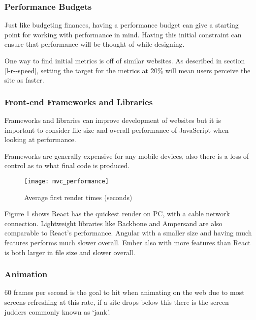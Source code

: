 \subsubsection{Performance Budgets} \label{l-r--performance-budgets}

Just like budgeting finances, having a performance budget can give a starting point for working with performance in mind. Having this initial constraint can ensure that performance will be thought of while designing. \cite{performance_budget}

One way to find initial metrics is off of similar websites. As described in section \ref{l-r--speed}, setting the target for the metrics at 20\% will mean users perceive the site as faster.

\subsubsection{Front-end Frameworks and Libraries} \label{l-r--frameworks}

Frameworks and libraries can improve development of websites but it is important to consider file size and overall performance of JavaScript when looking at performance.

Frameworks are generally expensive for any mobile devices, also there is a loss of control as to what final code is produced. \cite{cost_of_frameworks}

\begin{figure}[H]
  \centering
    \texttt{[image: mvc\_performance]}
  \caption{Average first render times (seconds) \protect\cite{performance_mvc}}
  \label{figure-average-first-render}
\end{figure}

Figure \ref{figure-average-first-render} shows React has the quickest render on PC, with a cable network connection. Lightweight libraries like Backbone and Ampersand are also comparable to React's performance. Angular with a smaller size and  having much features performs much slower overall. Ember also with more features than React is both larger in file size and slower overall.

\subsubsection{Animation} \label{l-r--animation}

60 frames per second is the goal to hit when animating on the web due to most screens refreshing at this rate, if a site drops below this there is the screen judders commonly known as `jank'. \cite{jank}

